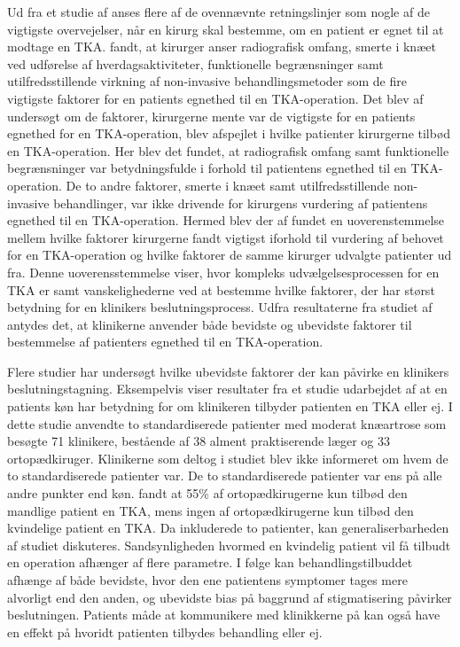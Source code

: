 Ud fra et studie af  anses flere af de ovennævnte retningslinjer som nogle af de vigtigste overvejelser, når en kirurg skal bestemme, om en patient er egnet til at modtage en TKA.  fandt, at kirurger anser radiografisk omfang, smerte i knæet ved udførelse af hverdagsaktiviteter, funktionelle begrænsninger samt utilfredsstillende virkning af non-invasive behandlingsmetoder som de fire vigtigste faktorer for en patients egnethed til en TKA-operation. Det blev af  undersøgt om de faktorer, kirurgerne mente var de vigtigste for en patients egnethed for en TKA-operation, blev afspejlet i hvilke patienter kirurgerne tilbød en TKA-operation. Her blev det fundet, at radiografisk omfang samt funktionelle begrænsninger var betydningsfulde i forhold til patientens egnethed til en TKA-operation. De to andre faktorer, smerte i knæet samt utilfredsstillende non-invasive behandlinger, var ikke drivende for kirurgens vurdering af patientens egnethed til en TKA-operation. Hermed blev der af  fundet en uoverenstemmelse mellem hvilke faktorer kirurgerne fandt vigtigst iforhold til vurdering af behovet for en TKA-operation og hvilke faktorer de samme kirurger udvalgte patienter ud fra. Denne uoverensstemmelse viser, hvor kompleks udvælgelsesprocessen for en TKA er samt vanskelighederne ved at bestemme hvilke faktorer, der har størst betydning for en klinikers beslutningsprocess. Udfra resultaterne fra studiet af  antydes det, at klinikerne anvender både bevidste og ubevidste faktorer til bestemmelse af patienters egnethed til en TKA-operation.    


Flere studier har undersøgt hvilke ubevidste faktorer der kan påvirke en klinikers beslutningstagning. Eksempelvis viser resultater fra et studie udarbejdet af \cite{borkhoff2008} at en patients køn har betydning for om klinikeren tilbyder patienten en TKA eller ej. I dette studie anvendte \cite{borkhoff2008} to standardiserede patienter med moderat knæartrose som besøgte 71 klinikere, bestående af 38 alment praktiserende læger og 33 ortopædkiruger. Klinikerne som deltog i studiet blev ikke informeret om hvem de to standardiserede patienter var. De to standardiserede patienter var ens på alle andre punkter end køn. \cite{borkhoff2008} fandt at 55\% af ortopædkirugerne  kun tilbød den mandlige patient en TKA, mens ingen af ortopædkirugerne  kun tilbød den kvindelige patient en TKA. Da   inkluderede to patienter, kan generaliserbarheden af studiet diskuteres. Sandsynligheden hvormed en kvindelig patient vil få tilbudt en operation afhænger af flere parametre. I følge  kan
behandlingstilbuddet afhænge af både bevidste, hvor den ene patientens symptomer tages mere alvorligt end den anden, og ubevidste bias på baggrund af stigmatisering påvirker beslutningen. Patients måde at kommunikere med klinikkerne på kan også have en effekt på hvoridt patienten tilbydes behandling eller ej. \cite{borkhoff2008}



